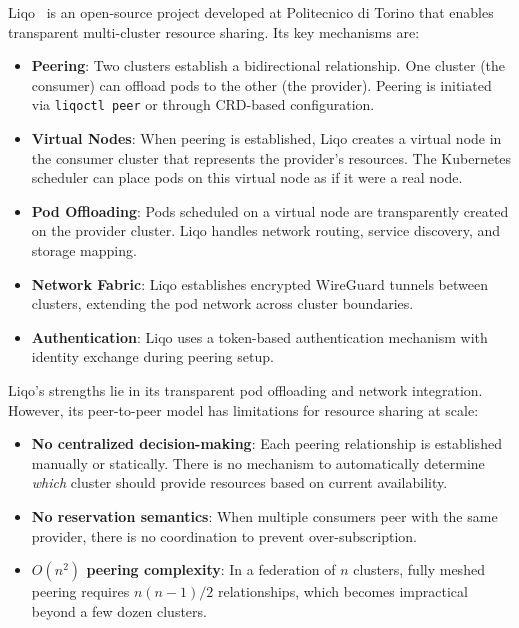 Liqo~\cite{liqo} is an open-source project developed at Politecnico di Torino that enables transparent multi-cluster resource sharing. Its key mechanisms are:

\begin{itemize}
    \item \textbf{Peering}: Two clusters establish a bidirectional relationship. One cluster (the consumer) can offload pods to the other (the provider). Peering is initiated via \texttt{liqoctl peer} or through CRD-based configuration.

    \item \textbf{Virtual Nodes}: When peering is established, Liqo creates a virtual node in the consumer cluster that represents the provider's resources. The Kubernetes scheduler can place pods on this virtual node as if it were a real node.

    \item \textbf{Pod Offloading}: Pods scheduled on a virtual node are transparently created on the provider cluster. Liqo handles network routing, service discovery, and storage mapping.

    \item \textbf{Network Fabric}: Liqo establishes encrypted WireGuard tunnels between clusters, extending the pod network across cluster boundaries.

    \item \textbf{Authentication}: Liqo uses a token-based authentication mechanism with identity exchange during peering setup.
\end{itemize}

Liqo's strengths lie in its transparent pod offloading and network integration. However, its peer-to-peer model has limitations for resource sharing at scale:

\begin{itemize}
    \item \textbf{No centralized decision-making}: Each peering relationship is established manually or statically. There is no mechanism to automatically determine \emph{which} cluster should provide resources based on current availability.
    \item \textbf{No reservation semantics}: When multiple consumers peer with the same provider, there is no coordination to prevent over-subscription.
    \item \textbf{$O(n^2)$ peering complexity}: In a federation of $n$ clusters, fully meshed peering requires $n(n-1)/2$ relationships, which becomes impractical beyond a few dozen clusters.
\end{itemize}

